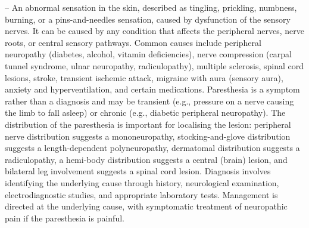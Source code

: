 -- An abnormal sensation in the skin, described as tingling, prickling, numbness, burning, or a pins-and-needles sensation, caused by dysfunction of the sensory nerves. It can be caused by any condition that affects the peripheral nerves, nerve roots, or central sensory pathways. Common causes include peripheral neuropathy (diabetes, alcohol, vitamin deficiencies), nerve compression (carpal tunnel syndrome, ulnar neuropathy, radiculopathy), multiple sclerosis, spinal cord lesions, stroke, transient ischemic attack, migraine with aura (sensory aura), anxiety and hyperventilation, and certain medications. Paresthesia is a symptom rather than a diagnosis and may be transient (e.g., pressure on a nerve causing the limb to fall asleep) or chronic (e.g., diabetic peripheral neuropathy). The distribution of the paresthesia is important for localising the lesion: peripheral nerve distribution suggests a mononeuropathy, stocking-and-glove distribution suggests a length-dependent polyneuropathy, dermatomal distribution suggests a radiculopathy, a hemi-body distribution suggests a central (brain) lesion, and bilateral leg involvement suggests a spinal cord lesion. Diagnosis involves identifying the underlying cause through history, neurological examination, electrodiagnostic studies, and appropriate laboratory tests. Management is directed at the underlying cause, with symptomatic treatment of neuropathic pain if the paresthesia is painful.


